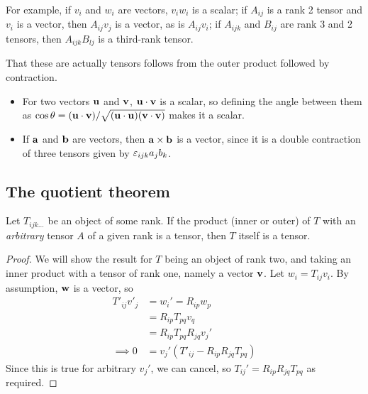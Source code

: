\documentclass{../template/note}
\begin{document}
    For example, if \(v_i\) and \(w_i\) are vectors, \(v_iw_i\) is a scalar; if \(A_{ij}\) is a rank 2 tensor and \(v_i\) is a vector, then \(A_{ij}v_j\) is a vector, as is \(A_{ij}v_i\); if \(A_{ijk}\) and \(B_{ij}\) are rank 3 and 2 tensors, then \(A_{ijk}B_{lj}\) is a third-rank tensor.

    That these are actually tensors follows from the outer product followed by contraction.

    \begin{example*}
        \begin{itemize}
            \item For two vectors \(\V u\) and \(\V v\), \(\V u \cdot \V v\) is a scalar, so defining the angle between them as \(\cos \theta = (\V u \cdot \V v)/\sqrt{(\V u \cdot \V u)(\V v \cdot \V v)}\) makes it a scalar.
            \item If \(\V a\) and \(\V b\) are vectors, then \(\V a \times \V b\) is a vector, since it is a double contraction of three tensors given by \(\varepsilon_{ijk}a_jb_k\).
        \end{itemize}
    \end{example*}
    
    \subsection{The quotient theorem}

    \begin{theorem*}
        \label{quot-thm}
        Let \(T_{ijk\dots}\) be an object of some rank. If the product (inner or outer) of \(T\) with an \emph{arbitrary} tensor \(A\) of a given rank is a tensor, then \(T\) itself is a tensor.
    \end{theorem*}
    

    \begin{proof}
        We will show the result for \(T\) being an object of rank two, and taking an inner product with a tensor of rank one, namely a vector \(\V v\). Let \(w_i = T_{ij}v_i\). By assumption, \(\V w\) is a vector, so
        \begin{align*}
            T'_{ij}v'_j &= w_i' = R_{ip}w_p \\
            &= R_{ip} T_{pq} v_q \\
            &= R_{ip} T_{pq} R_{jq} v_j' \\
            \implies 0 &= v_j'(T'_{ij} - R_{ip}R_{jq}T_{pq})
        \end{align*}
        Since this is true for arbitrary \(v_j'\), we can cancel, so \(T_{ij}' = R_{ip}R_{jq}T_{pq}\) as required.
    \end{proof}
    
\end{document}
